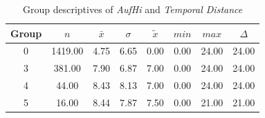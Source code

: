 \begin{table}[ht]
	\small
	\centering
    \begin{tabular}{c|c|c|c|c|c|c|c}
        \toprule
        Group & $n$ & $\bar{x}$ & $\sigma$ & $\tilde{x}$ & $min$ & $max$ & $\Delta$ \\ 
        \midrule
        0 & 1419.00 & 4.75 & 6.65 & 0.00 & 0.00 & 24.00 & 24.00 \\ 
        3 & 381.00 & 7.90 & 6.87 & 7.00 & 0.00 & 24.00 & 24.00 \\ 
        4 & 44.00 & 8.43 & 8.13 & 7.00 & 0.00 & 24.00 & 24.00 \\ 
        5 & 16.00 & 8.44 & 7.87 & 7.50 & 0.00 & 21.00 & 21.00 \\ 
        \bottomrule
      \end{tabular}
	\caption{Group descriptives of \textit{AufHi} and \textit{Temporal Distance}}
	\label{tbl:descriptives_baysis_matched_AufHi_TDist}
\end{table}

